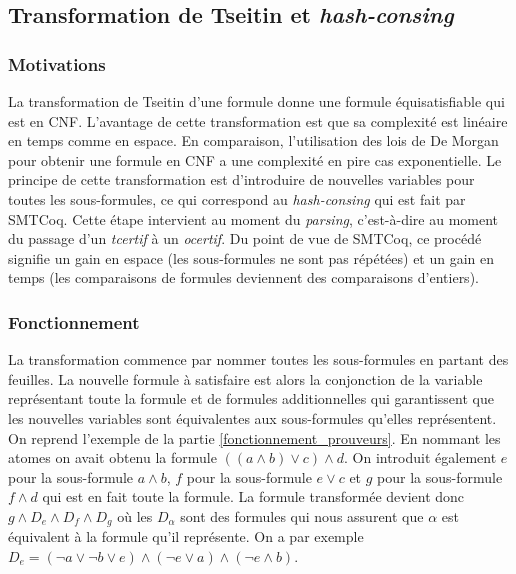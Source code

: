 \documentclass[11pt]{article}
\begin{document}
\subsection{Transformation de Tseitin et \textit{hash-consing}} \label{tseitin}

\subsubsection{Motivations}

La transformation de Tseitin d'une formule donne une formule équisatisfiable qui est en CNF. L'avantage de cette transformation est que sa complexité est linéaire en temps comme en espace. En comparaison, l'utilisation des lois de De Morgan pour obtenir une formule en CNF a une complexité en pire cas exponentielle. Le principe de cette transformation est d'introduire de nouvelles variables pour toutes les sous-formules, ce qui correspond au \textit{hash-consing} qui est fait par SMTCoq. Cette étape intervient au moment du \textit{parsing}, c'est-à-dire au moment du passage d'un \textit{tcertif} à un \textit{ocertif}. Du point de vue de SMTCoq, ce procédé signifie un gain en espace (les sous-formules ne sont pas répétées) et un gain en temps (les comparaisons de formules deviennent des comparaisons d'entiers).


\subsubsection{Fonctionnement}

La transformation commence par nommer toutes les sous-formules en partant des feuilles. La nouvelle formule à satisfaire est alors la conjonction de la variable représentant toute la formule et de formules additionnelles qui garantissent que les nouvelles variables sont équivalentes aux sous-formules qu'elles représentent. \\

On reprend l'exemple de la partie \ref{fonctionnement_prouveurs}. En nommant les atomes on avait obtenu la formule $((a \wedge b) \vee c) \wedge d$. On introduit également $e$ pour la sous-formule $a \wedge b$, $f$ pour la sous-formule $e \vee c$ et $g$ pour la sous-formule $f \wedge d$ qui est en fait toute la formule. La formule transformée devient donc $g \wedge D_e \wedge D_f \wedge D_g$ où les $D_\alpha$ sont des formules qui nous assurent que $\alpha$ est équivalent à la formule qu'il représente. On a par exemple $D_e = (\neg a \vee \neg b \vee e) \wedge (\neg e \vee a) \wedge (\neg e \wedge b)$. \\
\end{document}

